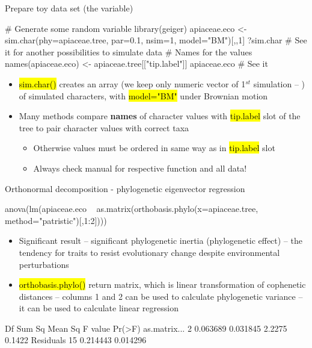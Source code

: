 \documentclass[compress, ucs, xelatex, 11pt, xcolor=svgnames,
  hyperref={
    bookmarks=true,
    unicode=true,
    colorlinks=true,
    pdftitle={Molecular data in R},
    plainpages=false,
    pdfauthor={Vojtech Zeisek},
    pdfsubject={Course about phylogeny and evolution in R},
    pdfcreator={XeLaTeX},
    pdfkeywords={R, evolution, phylogeny, molecular data},
    linkcolor=Tomato,
    anchorcolor=SaddleBrown,
    citecolor=Goldenrod,
    filecolor=DarkMagenta,
    menucolor=Sienna,
    urlcolor=DarkTurquoise,
    pdftex},
  url={hyphens, lowtilde} %
  ]{beamer}
\renewcommand{\texttt}[1]{\hl{\ttfamily #1}}
\begin{document}
\begin{frame}[fragile]{Prepare toy data set (the variable)}
  \begin{spluscode}
    # Generate some random variable
    library(geiger)
    apiaceae.eco <- sim.char(phy=apiaceae.tree, par=0.1, nsim=1,
      model="BM")[,,1]
    ?sim.char # See it for another possibilities to simulate data
    # Names for the values
    names(apiaceae.eco) <- apiaceae.tree[["tip.label"]]
    apiaceae.eco # See it
  \end{spluscode}
  \begin{itemize}
    \item \texttt{sim.char()} creates an array (we keep only numeric vector of 1$^{st}$ simulation -- \texttt{[,,1]}) of simulated characters, with \texttt{model="BM"} under Brownian motion
    \item Many methods compare \textbf{names} of character values with \texttt{tip.label} slot of the tree to pair character values with correct taxa
    \begin{itemize}
      \item Otherwise values must be ordered in same way as in \texttt{tip.label} slot
      \item \alert{Always check manual for respective function and all data!}
    \end{itemize}
  \end{itemize}
\end{frame}

\begin{frame}[fragile]{Orthonormal decomposition - phylogenetic eigenvector regression}
  \begin{spluscode}
    anova(lm(apiaceae.eco ~ as.matrix(orthobasis.phylo(x=apiaceae.tree,
      method="patristic")[,1:2])))
  \end{spluscode}
  \begin{itemize}
    \item Significant result -- significant phylogenetic inertia (phylogenetic effect) -- the tendency for traits to resist evolutionary change despite environmental perturbations
    \item \texttt{orthobasis.phylo()} return matrix, which is linear transformation of cophenetic distances -- columns 1 and 2 can be used to calculate phylogenetic variance -- it can be used to calculate linear regression
  \end{itemize}
  \begin{spluscode}
                 Df   Sum Sq  Mean Sq F value Pr(>F)
    as.matrix...  2 0.063689 0.031845  2.2275 0.1422
    Residuals    15 0.214443 0.014296
  \end{spluscode}
\end{frame}
\end{document}
